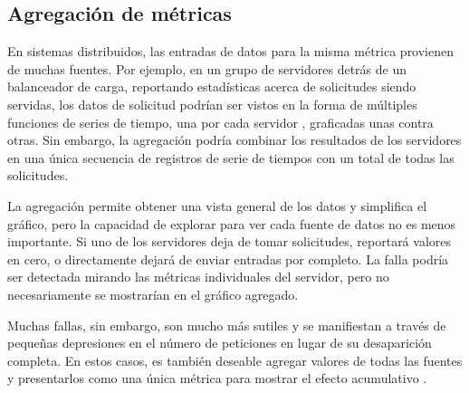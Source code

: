 \subsection*{Agregación de métricas}
\label{agregacion_de_metricas}

En sistemas distribuidos, las entradas de datos para la misma métrica provienen
de muchas fuentes. Por ejemplo, en un grupo de servidores  detrás
de un balanceador de carga, reportando estadísticas acerca de solicitudes
siendo servidas, los datos de solicitud podrían ser vistos en la forma de
múltiples funciones de series de tiempo, una por cada servidor ,
graficadas unas contra otras. Sin embargo, la agregación podría combinar los
resultados de los servidores  en una única secuencia de registros
de serie de tiempos con un total de todas las solicitudes.

La agregación permite obtener una vista general de los datos y simplifica el
gráfico, pero la capacidad de explorar para ver cada fuente de datos no es
menos importante. Si  uno de los servidores deja de tomar solicitudes,
reportará valores en cero, o directamente dejará de enviar entradas por
completo. La falla podría ser detectada mirando las métricas individuales del
servidor, pero no necesariamente se mostrarían en el gráfico agregado.

Muchas fallas, sin embargo, son mucho más sutiles y se manifiestan a través de
pequeñas depresiones en el número de peticiones en lugar de su desaparición
completa. En estos casos, es también deseable agregar valores de todas las
fuentes y presentarlos como una única métrica para mostrar el efecto
acumulativo \cite[p.~21-25]{monitoreo:efective_monitoring_and_alerting}.
